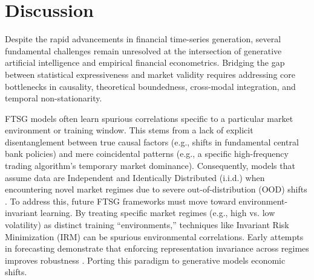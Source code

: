 \section{Discussion}
\label{sec:discussion}

Despite the rapid advancements in financial time-series generation, several fundamental challenges remain unresolved at the intersection of generative artificial intelligence and empirical financial econometrics. Bridging the gap between statistical expressiveness and market validity requires addressing core bottlenecks in causality, theoretical boundedness, cross-modal integration, and temporal non-stationarity.

FTSG models often learn spurious correlations specific to a particular market environment or training window. This stems from a lack of explicit disentanglement between true causal factors (e.g., shifts in fundamental central bank policies) and mere coincidental patterns (e.g., a specific high-frequency trading algorithm's temporary market dominance). Consequently, models that assume data are Independent and Identically Distributed (i.i.d.) when encountering novel market regimes due to severe out-of-distribution (OOD) shifts \citep{arjovsky2019invariant, peters2016causal}. 
To address this, future FTSG frameworks must move toward environment-invariant learning. By treating specific market regimes (e.g., high vs. low volatility) as distinct training ``environments,'' techniques like Invariant Risk Minimization (IRM) \citep{arjovsky2019invariant} can be spurious environmental correlations. Early attempts in forecasting demonstrate that enforcing representation invariance across regimes improves robustness \citep{cao2023irm}. Porting this paradigm to generative models economic shifts.


